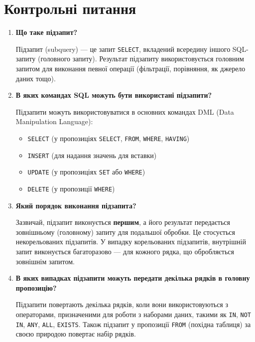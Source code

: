\documentclass{article}
\begin{document}
    \section*{Контрольні питання}
    \begin{enumerate}[label=\arabic*., leftmargin=*]
        \item \textbf{Що таке підзапит?}
        
        Підзапит (subquery) — це запит \texttt{SELECT}, вкладений всередину іншого SQL-запиту (головного запиту). Результат підзапиту використовується головним запитом для виконання певної операції (фільтрації, порівняння, як джерело даних тощо).

        \item \textbf{В яких командах SQL можуть бути використані підзапити?}
        
        Підзапити можуть використовуватися в основних командах DML (Data Manipulation Language):
        \begin{itemize}
            \item \texttt{SELECT} (у пропозиціях \texttt{SELECT}, \texttt{FROM}, \texttt{WHERE}, \texttt{HAVING})
            \item \texttt{INSERT} (для надання значень для вставки)
            \item \texttt{UPDATE} (у пропозиціях \texttt{SET} або \texttt{WHERE})
            \item \texttt{DELETE} (у пропозиції \texttt{WHERE})
        \end{itemize}

        \item \textbf{Який порядок виконання підзапита?}
        
        Зазвичай, підзапит виконується \textbf{першим}, а його результат передається зовнішньому (головному) запиту для подальшої обробки. Це стосується некорельованих підзапитів. У випадку корельованих підзапитів, внутрішній запит виконується багаторазово — для кожного рядка, що обробляється зовнішнім запитом.

        \item \textbf{В яких випадках підзапити можуть передати декілька рядків в головну пропозицію?}
        
        Підзапити повертають декілька рядків, коли вони використовуються з операторами, призначеними для роботи з наборами даних, такими як \texttt{IN}, \texttt{NOT IN}, \texttt{ANY}, \texttt{ALL}, \texttt{EXISTS}. Також підзапит у пропозиції \texttt{FROM} (похідна таблиця) за своєю природою повертає набір рядків.


\end{enumerate}
\end{document}
